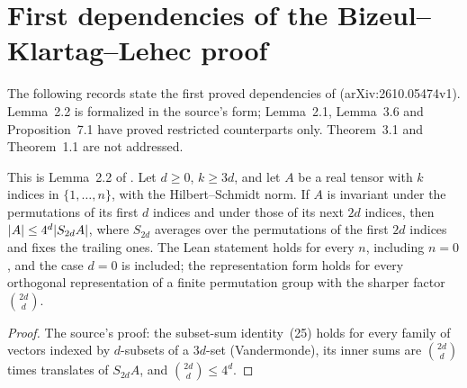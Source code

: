 \section{First dependencies of the Bizeul--Klartag--Lehec proof}

The following records state the first proved dependencies of \cite{BizeulKlartagLehec2026}
(arXiv:2610.05474v1).  Lemma~2.2 is formalized in the source's form; Lemma~2.1, Lemma~3.6 and
Proposition~7.1 have proved restricted counterparts only.  Theorem~3.1 and Theorem~1.1 are not
addressed.

\begin{lemma}
  \label{lem:bkl-partial-symmetrization}
  \leanok
  This is Lemma~2.2 of \cite{BizeulKlartagLehec2026}.  Let $d\ge0$, $k\ge3d$, and let $A$ be a
  real tensor with $k$ indices in $\{1,\dots,n\}$, with the Hilbert--Schmidt norm.  If $A$ is
  invariant under the permutations of its first $d$ indices and under those of its next $2d$
  indices, then $\lvert A\rvert\le4^d\lvert S_{2d}A\rvert$, where $S_{2d}$ averages over the permutations of the
  first $2d$ indices and fixes the trailing ones.  The Lean statement holds for every $n$, including
  $n=0$, and the case $d=0$ is included; the representation form holds for every orthogonal
  representation of a finite permutation group with the sharper factor $\binom{2d}{d}$.
\end{lemma}
\begin{proof}
  \leanok
  The source's proof: the subset-sum identity~(25) holds for every family of vectors indexed by
  $d$-subsets of a $3d$-set (Vandermonde), its inner sums are $\binom{2d}{d}$ times translates of
  $S_{2d}A$, and $\binom{2d}{d}\le4^d$.
\end{proof}

